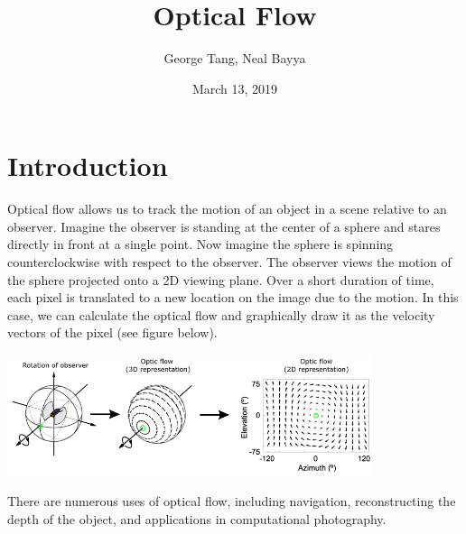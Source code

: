 \documentclass{article}
\title{Optical Flow}
\author{George Tang, Neal Bayya}
\date{March 13, 2019}
\begin{document}
\maketitle

\section{Introduction}
Optical flow allows us to track the motion of an object in a scene relative to an observer. Imagine the observer is standing at the center of a sphere and stares directly in front at a single point. Now imagine the sphere is spinning counterclockwise with respect to the observer. The observer views the motion of the sphere projected onto a 2D viewing plane. Over a short duration of time, each pixel is translated to a new location on the image due to the motion. In this case, we can calculate the optical flow and graphically draw it as the velocity vectors of the pixel (see figure below).

\begin{center}
    \includegraphics[width=0.8\textwidth]{optical1.png}
\end{center}
\noindent
There are numerous uses of optical flow, including navigation, reconstructing the depth of the object, and applications in computational photography. 
\end{document}
